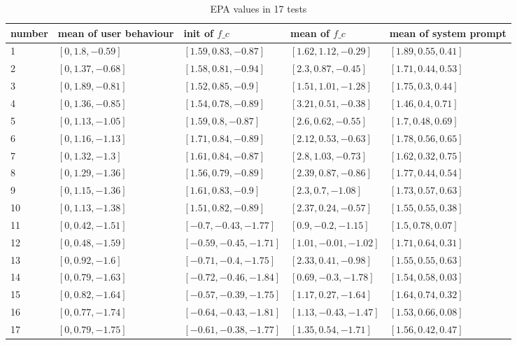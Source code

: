 %
\begin{table}\small
\centering
\caption{EPA values in 17 tests}
\label{table:compare-epa-all}
\begin{tabular}{|  p{1.2cm} | p{2.6cm} |  p{3.5cm} |  p{3.4cm} |  p{3.0cm} |}
\hline
number & mean of user behaviour & init of $f\_c$ & mean of $f\_c$ & mean of system prompt \\ \hline
1 & $[0, 1.8, -0.59]$ & $[1.59, 0.83, -0.87]$ & $[1.62, 1.12, -0.29]$ & $[1.89, 0.55, 0.41]$ \\ \hline
2 & $[0, 1.37, -0.68]$ & $[1.58, 0.81, -0.94]$ & $[2.3, 0.87, -0.45]$ & $[1.71, 0.44, 0.53]$ \\ \hline
3 & $[0, 1.89, -0.81]$ & $[1.52, 0.85, -0.9]$ & $[1.51, 1.01, -1.28]$ & $[1.75, 0.3, 0.44]$ \\ \hline
4 & $[0, 1.36, -0.85]$ & $[1.54, 0.78, -0.89]$ & $[3.21, 0.51, -0.38]$ & $[1.46, 0.4, 0.71]$ \\ \hline
5 & $[0, 1.13, -1.05]$ & $[1.59, 0.8, -0.87]$ & $[2.6, 0.62, -0.55]$ & $[1.7, 0.48, 0.69]$ \\ \hline
6 & $[0, 1.16, -1.13]$ & $[1.71, 0.84, -0.89]$ & $[2.12, 0.53, -0.63]$ & $[1.78, 0.56, 0.65]$ \\ \hline
7 & $[0, 1.32, -1.3]$ & $[1.61, 0.84, -0.87]$ & $[2.8, 1.03, -0.73]$ & $[1.62, 0.32, 0.75]$ \\ \hline
8 & $[0, 1.29, -1.36]$ & $[1.56, 0.79, -0.89]$ & $[2.39, 0.87, -0.86]$ & $[1.77, 0.44, 0.54]$ \\ \hline
9 & $[0, 1.15, -1.36]$ & $[1.61, 0.83, -0.9]$ & $[2.3, 0.7, -1.08]$ & $[1.73, 0.57, 0.63]$ \\ \hline
10 & $[0, 1.13, -1.38]$ & $[1.51, 0.82, -0.89]$ & $[2.37, 0.24, -0.57]$ & $[1.55, 0.55, 0.38]$ \\ \hline
11 & $[0, 0.42, -1.51]$ & $[-0.7, -0.43, -1.77]$ & $[0.9, -0.2, -1.15]$ & $[1.5, 0.78, 0.07]$ \\ \hline
12 & $[0, 0.48, -1.59]$ & $[-0.59, -0.45, -1.71]$ & $[1.01, -0.01, -1.02]$ & $[1.71, 0.64, 0.31]$ \\ \hline
13 & $[0, 0.92, -1.6]$ & $[-0.71, -0.4, -1.75]$ & $[2.33, 0.41, -0.98]$ & $[1.55, 0.55, 0.63]$ \\ \hline
14 & $[0, 0.79, -1.63]$ & $[-0.72, -0.46, -1.84]$ & $[0.69, -0.3, -1.78]$ & $[1.54, 0.58, 0.03]$ \\ \hline
15 & $[0, 0.82, -1.64]$ & $[-0.57, -0.39, -1.75]$ & $[1.17, 0.27, -1.64]$ & $[1.64, 0.74, 0.32]$ \\ \hline
16 & $[0, 0.77, -1.74]$ & $[-0.64, -0.43, -1.81]$ & $[1.13, -0.43, -1.47]$ & $[1.53, 0.66, 0.08]$ \\ \hline
17 & $[0, 0.79, -1.75]$ & $[-0.61, -0.38, -1.77]$ & $[1.35, 0.54, -1.71]$ & $[1.56, 0.42, 0.47]$ \\ \hline
\end{tabular}
\end{table}

